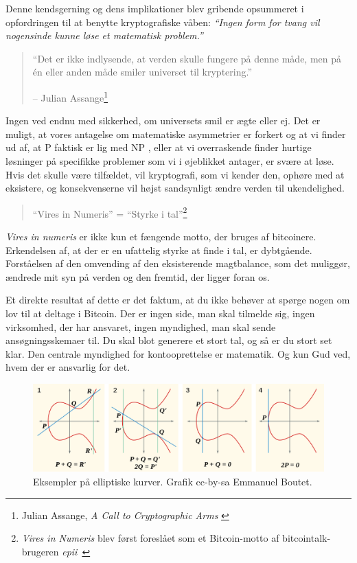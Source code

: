 \documentclass[paper=6in:9in,pagesize=pdftex,headinclude=on,footinclude=on,12pt]{scrbook}
\begin{document}
Denne kendsgerning og dens implikationer blev gribende opsummeret i opfordringen til at benytte kryptografiske våben: \textit{\enquote{Ingen form for tvang vil nogensinde kunne løse et matematisk problem.}}\begin{quotation}\begin{samepage} \enquote{Det er ikke indlysende, at verden skulle fungere på denne måde, men på \'en eller anden måde smiler universet til kryptering.} \begin{flushright} -- Julian Assange\footnote{Julian Assange, \textit{A Call to Cryptographic Arms} \cite{call-to-cryptographic-arms}}
\end{flushright}\end{samepage}\end{quotation}

Ingen ved endnu med sikkerhed, om universets smil er ægte eller ej. Det er muligt, at vores antagelse om matematiske asymmetrier er forkert og at vi finder ud af, at P faktisk er lig med NP \cite{wiki:pnp}, eller at vi overraskende finder hurtige løsninger på specifikke problemer \cite{wiki:discrete-log} som vi i øjeblikket antager, er svære at løse. Hvis det skulle være tilfældet, vil kryptografi, som vi kender den, ophøre med at eksistere, og konsekvenserne vil højst sandsynligt ændre verden til ukendelighed.\begin{quotation}\begin{samepage} \enquote{Vires in Numeris} = \enquote{Styrke i tal}\footnote{\textit{Vires in Numeris} blev først foreslået som et Bitcoin-motto af bitcointalk-brugeren \textit{epii}~\cite{epii}}
\end{samepage}\end{quotation}

\textit{Vires in numeris} er ikke kun et fængende motto, der bruges af bitcoinere. Erkendelsen af, at der er en ufattelig styrke at finde i tal, er dybtgående. Forståelsen af den omvending af den eksisterende magtbalance, som det muliggør, ændrede mit syn på verden og den fremtid, der ligger foran os.

Et direkte resultat af dette er det faktum, at du ikke behøver at spørge nogen om lov til at deltage i Bitcoin. Der er ingen side, man skal tilmelde sig, ingen virksomhed, der har ansvaret, ingen myndighed, man skal sende ansøgningsskemaer til. Du skal blot generere et stort tal, og så er du stort set klar. Den centrale myndighed for kontooprettelse er matematik. Og kun Gud ved, hvem der er ansvarlig for det.\begin{figure}
  \includegraphics{assets/images/elliptic-curve-examples.png}
  \caption{Eksempler på elliptiske kurver. Grafik cc-by-sa Emmanuel Boutet.}
  \label{fig:elliptic-curve-examples}
\end{figure}
\end{document}
